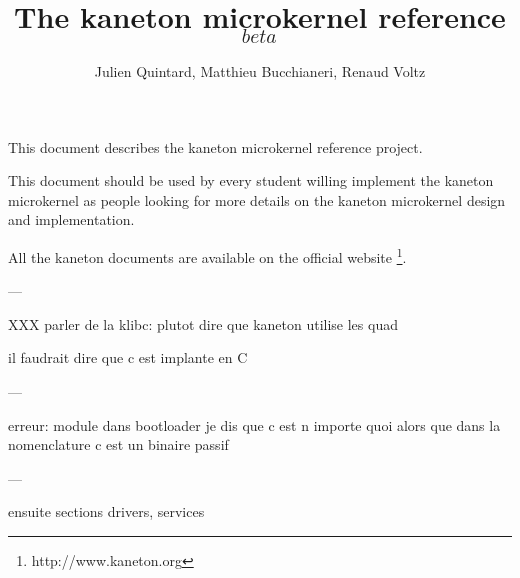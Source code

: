 
%
%



%
%

\rhead{}

%
%

\title{The kaneton microkernel reference $_{beta}$
       \logos}

%
%

\author{\small{Julien Quintard},
        \small{Matthieu Bucchianeri},
        \small{Renaud Voltz}}

%
%



%
%

\maketitle

%
%

%
%

This document describes the kaneton microkernel reference project.

This document should be used by every student willing implement the
kaneton microkernel as people looking for more details on the kaneton
microkernel design and implementation.

All the kaneton documents are available on
the official website
  \footnote{http://www.kaneton.org}.

%
%

\tableofcontents

%
%











%

%

%
%



---

XXX parler de la klibc: plutot dire que kaneton utilise les quad

il faudrait dire que c est implante en C

---

erreur: module dans bootloader je dis que c est n importe quoi alors
 que dans la nomenclature c est un binaire passif

---

ensuite sections drivers, services

